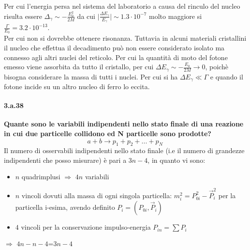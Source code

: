 \documentclass[twoside]{article}
\begin{document}
Per cui l'energia persa nel sistema del laboratorio a causa del rinculo del nucleo risulta essere $\Delta_\gamma\sim-\frac{E_0^2}{2M}$ da cui $\biggl|\frac{\Delta E_\gamma}{E_\gamma}\biggr|\sim1.3 \cdot 10^{-7}$ molto maggiore si $\frac{\Gamma}{E_0}=3.2\cdot10^{-13}$.\\
Per cui non si dovrebbe ottenere risonanza.
Tuttavia in alcuni materiali cristallini il nucleo che effettua il decadimento può non essere considerato isolato ma connesso agli altri nuclei del reticolo. Per cui la quantità di moto del fotone emesso viene assorbita da tutto il cristallo, per cui $\Delta E_\gamma\sim-\frac{E_0}{2M}\to 0$, poichè bisogna considerare la massa di tutti i nuclei. Per cui si ha $\Delta E_\gamma\ll \Gamma$ e quando il fotone incide su un altro nucleo di ferro lo eccita.

%

\paragraph{3.a.38}\textbf{Quante sono le variabili indipendenti nello stato finale di una reazione in cui due particelle collidono ed N particelle sono prodotte?}\\
\begin{equation}
a+b \longrightarrow p_1+p_2+...+p_N \, 
\end{equation}
Il numero di osservabili indipendenti nello stato finale (i.e il numero di grandezze indipendenti che posso misurare) è pari a $3n-4$, in quanto vi sono:
\begin{itemize}
    \item $n$ quadrimplusi $\Rightarrow$ $4n$ variabili
    \item $n$ vincoli dovuti alla massa di ogni singola particella: $m_i^2=P_{0i}^2-\vec{P}_i^2$ per la particella i-esima, 
    avendo definito $P_i=(P_{0i}, \vec{P}_i)$
    \item $4$ vincoli per la conservazione impulso-energia $P_{in}=\sum P_i$
\end{itemize}
$\Rightarrow$ $4n-n-4$=$3n-4$
\end{document}
